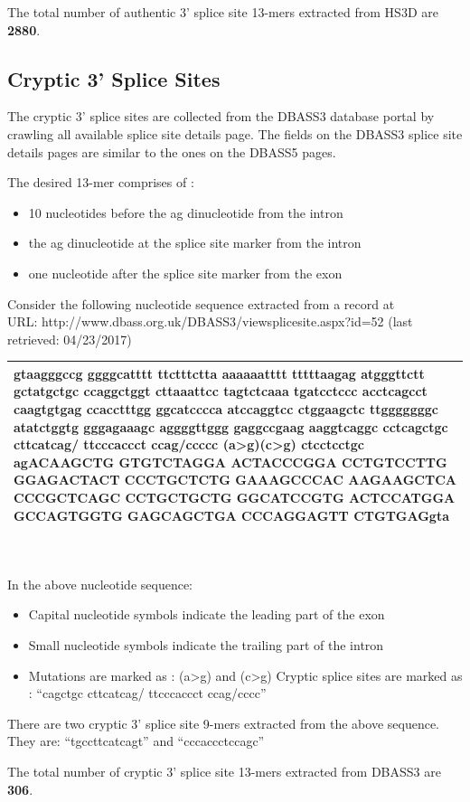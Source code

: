 \documentclass[12pt,a4paper]{article}
\begin{document}
	The total number of authentic 3’ splice site 13-mers extracted from HS3D are \textbf{2880}.

	\subsection{Cryptic 3' Splice Sites}
	The cryptic 3’ splice sites are collected from the DBASS3 database portal \cite{dbass-0,dbass-1,dbass-2} by crawling all available splice site details page. The fields on the DBASS3 splice site details pages are similar to the ones on the DBASS5 pages. \par 
	The desired 13-mer comprises of : 
	\begin{itemize}
		\item 10 nucleotides before the ag dinucleotide from the intron
		\item the ag dinucleotide at the splice site marker from the intron
		\item one nucleotide after the splice site marker from the exon
	\end{itemize}
	Consider the following nucleotide sequence extracted from a record at \\ URL: http://www.dbass.org.uk/DBASS3/viewsplicesite.aspx?id=52 (last retrieved: 04/23/2017)\par
	\vspace{5mm}	
	\begin{tabular}{ | p{\linewidth} |}
		\hline
		gtaagggccg ggggcatttt ttctttctta aaaaaatttt tttttaagag atgggttctt gctatgctgc ccaggctggt cttaaattcc tagtctcaaa tgatcctccc acctcagcct caagtgtgag ccacctttgg ggcatcccca atccaggtcc ctggaagctc ttgggggggc atatctggtg gggagaaagc aggggttggg gaggccgaag aaggtcaggc cctcagctgc cttcatca\textbf{g/ t}tcccaccct cca\textbf{g/c}cccc \textbf{(a>g)}\textbf{(c>g)} ctcctcctgc agACAAGCTG GTGTCTAGGA ACTACCCGGA CCTGTCCTTG GGAGACTACT CCCTGCTCTG GAAAGCCCAC AAGAAGCTCA CCCGCTCAGC CCTGCTGCTG GGCATCCGTG ACTCCATGGA GCCAGTGGTG GAGCAGCTGA CCCAGGAGTT CTGTGAGgta \\
		\hline
	\end{tabular}
	\\
	\\
	In the above nucleotide sequence:
	\begin{itemize}
	\item Capital nucleotide symbols indicate the leading part of the exon
	\item Small nucleotide symbols indicate the trailing part of the intron
	\item Mutations are marked as : (a>g) and (c>g)
	Cryptic splice sites are marked as : “cagctgc cttcatcag/ ttcccaccct ccag/cccc”
	\end{itemize}
	There are two cryptic 3’ splice site 9-mers extracted from the above sequence. They are: “tgccttcatcagt” and “cccaccctccagc” \par
	The total number of cryptic 3’ splice site 13-mers extracted from DBASS3 are \textbf{306}.
\end{document}
